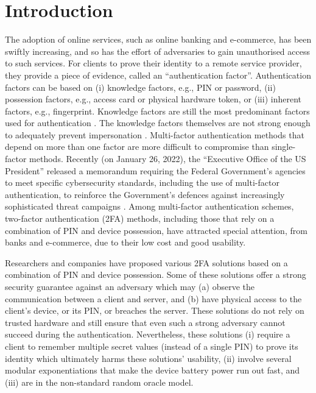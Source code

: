 


\section{Introduction}

The adoption of online services, such as online banking and e-commerce, has been swiftly increasing, and so has the effort of adversaries to gain unauthorised access to such services.  For clients to prove their identity to a remote service provider, they provide a piece of evidence, called an ``authentication factor''. Authentication factors can be based on (i) knowledge factors, e.g., PIN or password, (ii)  possession factors, e.g., access card or physical hardware token, or (iii) inherent factors, e.g., fingerprint.  
%
Knowledge factors are still the most predominant factors used for authentication \cite{bonneau2010password,JacommeK21}. 
%
%
 The knowledge factors themselves are not strong enough to adequately prevent impersonation 
 \cite{SinigagliaCCZ20,JacommeK21}.  Multi-factor authentication methods that depend on more than one factor are more difficult to compromise than single-factor methods. Recently (on January 26, 2022), the ``Executive Office of the US President'' released a memorandum requiring
the Federal Government's agencies to meet specific cybersecurity standards, including the use of multi-factor authentication, to reinforce the Government’s defences against increasingly sophisticated threat campaigns \cite{Zero-Trust-Cybersecurity}. 
% 
Among multi-factor authentication schemes, two-factor authentication (2FA) methods, including those that rely on a combination of PIN and device possession, have attracted special attention, from banks and e-commerce, due to their low cost and good usability. %
%


Researchers and companies have proposed various 2FA solutions based on a combination of PIN and device possession. Some of these solutions offer a strong security guarantee against an adversary which may (a) observe the communication between a client and server, and (b) have physical access to the client's device, or its PIN, or breaches the server. These solutions do not rely on trusted hardware and still ensure that even such a strong adversary cannot succeed during the authentication. Nevertheless, these solutions (i) require a client to remember multiple secret values (instead of a single PIN)  to prove its identity which ultimately harms these solutions' usability, (ii) involve several modular exponentiations that make the device battery power run out fast, and (iii) are in the non-standard random oracle model. 


